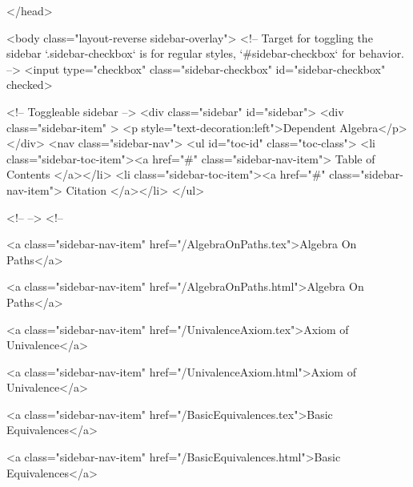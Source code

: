   
</head>




  <body class="layout-reverse sidebar-overlay">
    <!-- Target for toggling the sidebar `.sidebar-checkbox` is for regular
     styles, `#sidebar-checkbox` for behavior. -->
<input type="checkbox" class="sidebar-checkbox" id="sidebar-checkbox" checked>

<!-- Toggleable sidebar -->
<div class="sidebar" id="sidebar">
  <div class="sidebar-item" >
    <p style="text-decoration:left">Dependent Algebra</p>
  </div>
  <nav class="sidebar-nav">
    <ul id="toc-id" class="toc-class">
  <li class="sidebar-toc-item"><a href="#" class="sidebar-nav-item"> Table of Contents </a></li>
  <li class="sidebar-toc-item"><a href="#" class="sidebar-nav-item"> Citation </a></li>
</ul>


    <!--  -->
    <!-- 
      
    
      
    
      
    
      
    
      
        
      
    
      
        
          <a class="sidebar-nav-item" href="/AlgebraOnPaths.tex">Algebra On Paths</a>
        
      
    
      
        
          <a class="sidebar-nav-item" href="/AlgebraOnPaths.html">Algebra On Paths</a>
        
      
    
      
        
          <a class="sidebar-nav-item" href="/UnivalenceAxiom.tex">Axiom of Univalence</a>
        
      
    
      
        
          <a class="sidebar-nav-item" href="/UnivalenceAxiom.html">Axiom of Univalence</a>
        
      
    
      
        
          <a class="sidebar-nav-item" href="/BasicEquivalences.tex">Basic Equivalences</a>
        
      
    
      
        
          <a class="sidebar-nav-item" href="/BasicEquivalences.html">Basic Equivalences</a>
        

